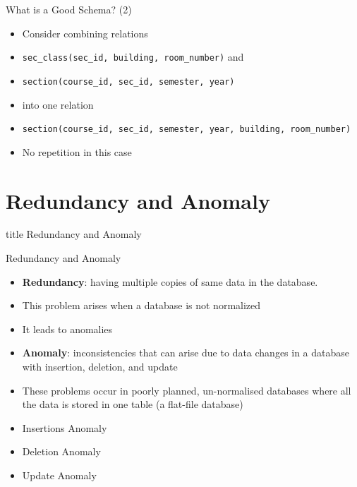 \documentclass[aspectratio=169, xcolor=dvipsnames]{beamer}
\begin{document}
\begin{frame}{What is a Good Schema? (2)}
    \begin{center}
    \end{center}
    \begin{itemize}[<+->]
        \item Consider combining relations
        \item \texttt{sec\_class(sec\_id, building, room\_number)} and
        \item \texttt{section(course\_id, sec\_id, semester, year)}
        \item into one relation
        \item \texttt{section(course\_id, sec\_id, semester, year, building, room\_number)}
        \item No repetition in this case
    \end{itemize}
\end{frame}

\section{Redundancy and Anomaly}
\begin{frame}
  \vfill
  \centering
  \begin{beamercolorbox}[sep=8pt,center,shadow=true,rounded=true]{title}
    Redundancy and Anomaly\par%
  \end{beamercolorbox}
  \vfill
\end{frame}

\begin{frame}{Redundancy and Anomaly}
    \begin{itemize}[<+->]
        \item \textbf{Redundancy}: having multiple copies of same data in the database.
        \item This problem arises when a database is not normalized
        \item It leads to anomalies
        \item \textbf{Anomaly}: inconsistencies that can arise due to data changes in a database with insertion, deletion, and update
        \item These problems occur in poorly planned, un-normalised databases where all the data is stored in one table (a flat-file database)
    \end{itemize}
    \vspace{1em}
    \begin{itemize}[<+->]
        \item Insertions Anomaly
        \item Deletion Anomaly
        \item Update Anomaly
    \end{itemize}
\end{frame}
\end{document}
